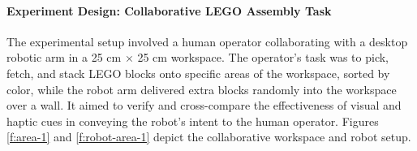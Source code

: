 




\paragraph{\textbf{Experiment Design: Collaborative LEGO Assembly Task}}
    The experimental setup involved a human operator collaborating with a desktop robotic arm in a 25 cm × 25 cm workspace. The operator's task was to pick, fetch, and stack LEGO blocks onto specific areas of the workspace, sorted by color, while the robot arm delivered extra blocks randomly into the workspace over a wall. It aimed to verify and cross-compare the effectiveness of visual and haptic cues in conveying the robot’s intent to the human operator. Figures \ref{f:area-1} and \ref{f:robot-area-1} depict the collaborative workspace and robot setup.

